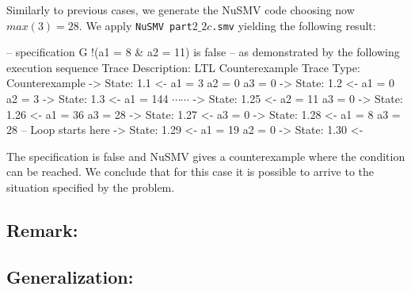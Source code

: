 \begin{description}
  Similarly to previous cases, we generate the NuSMV code choosing now $max(3)=28$. We apply {\tt NuSMV part$2\_2c$.smv} yielding the following result:

      \vspace{2mm}
\selectfont
{\footnotesize
\noindent
-- specification  G !(a1 = 8 \& a2 = 11)  is false\newline
-- as demonstrated by the following execution sequence\newline
Trace Description: LTL Counterexample\newline
Trace Type: Counterexample\newline
  -> State: 1.1 <-\newline
    a1 = 3\newline
    a2 = 0\newline
    a3 = 0\newline
  -> State: 1.2 <-\newline
    a1 = 0\newline
    a2 = 3\newline
  -> State: 1.3 <-\newline
    a1 = 144\newline
  $\cdots \cdots$
  \newline
  -> State: 1.25 <-\newline
    a2 = 11\newline
    a3 = 0\newline
  -> State: 1.26 <-\newline
    a1 = 36\newline
    a3 = 28\newline
  -> State: 1.27 <-\newline
    a3 = 0\newline
  -> State: 1.28 <-\newline
    a1 = 8\newline
    a3 = 28\newline
  -- Loop starts here\newline
  -> State: 1.29 <-\newline
    a1 = 19\newline
    a2 = 0\newline
  -> State: 1.30 <-\newline
}
\selectfont
\end{description}
The specification is false and NuSMV gives a counterexample where the condition can be reached. We conclude that for this case it is possible to arrive to the situation specified by the problem.

\subsection*{Remark:}


\subsection*{Generalization:}




